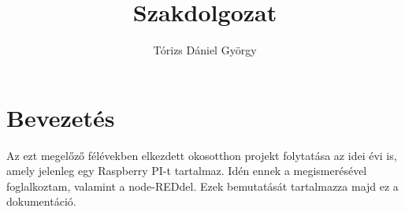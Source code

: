 \documentclass[a4paper,12pt,oneside]{report}
\begin{document}
\pagestyle{fancy}
\fancyhead[]{}
\fancyhead[C]{\thepage}
\fancyfoot[]{}
\fancyfoot[]{}
\renewcommand{\headrulewidth}{0pt}
\renewcommand{\footrulewidth}{0pt}




\title{Szakdolgozat}

\author{Tórizs Dániel György}

\date{}

\maketitle

\tableofcontents

\chapter{Bevezetés}

Az ezt megelőző félévekben elkezdett okosotthon projekt folytatása az idei évi is, amely jelenleg egy Raspberry PI-t tartalmaz.
Idén ennek a megismerésével foglalkoztam, valamint a node-REDdel. Ezek bemutatását tartalmazza majd ez a dokumentáció.
\end{document}
